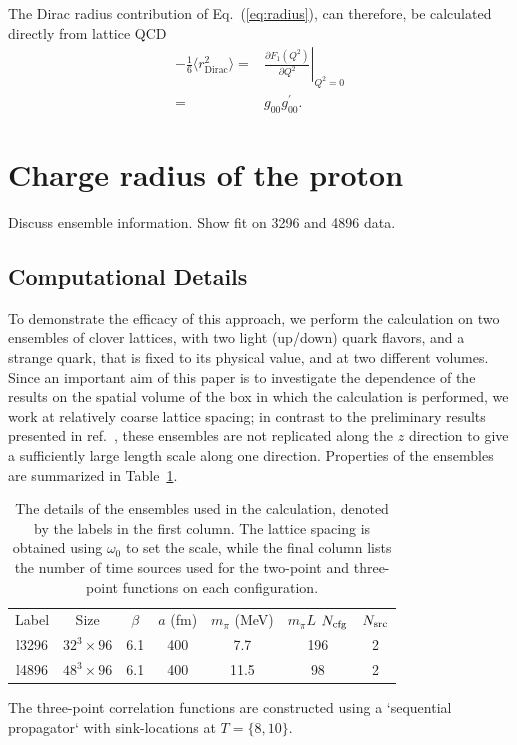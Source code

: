 \documentclass[prd,aps,twocolumn,superscriptaddress,tightenlines,nofootinbib,floatfix,preprintnumbers,10pt]{revtex4-1}
\begin{document}
The Dirac radius contribution of Eq.~(\ref{eq:radius}), can therefore, be calculated directly from lattice QCD
\begin{align}
 -\frac{1}{6}\langle r_{\mathrm{Dirac}}^2 \rangle =& \left. \frac{\partial F_1(Q^2)}{\partial
	Q^2}\right|_{Q^2=0}\nonumber \\
=&g_{00} g^\prime_{00}.
\end{align}
\section{Charge radius of the proton}\label{sec:results}
{\color{red} Discuss ensemble information. Show fit on 3296 and 4896 data.}
\subsection{Computational Details}
To demonstrate the efficacy of this approach, we perform the
calculation on two ensembles of clover lattices, with two light
(up/down) quark flavors, and a strange quark, that is fixed to its
physical value, and at two different volumes.  Since an important aim
of this paper is to investigate the dependence of the results on the
spatial volume of the box in which the calculation is performed, we
work at relatively coarse lattice spacing; in contrast to the
preliminary results presented in ref.~\cite{Bouchard:2016gmc}, these
ensembles are not replicated along the $z$ direction to give a
sufficiently large length scale along one direction.  Properties of
the ensembles are summarized in Table~\ref{tab:cfg}.
\begin{table}
  \begin{tabular}{ccccccc}
    Label & Size & $\beta$ & $a$ (fm) & $m_\pi$ (MeV) & $m_\pi L$ $N_{\rm cfg}$ & $N_{\rm src}$\\
    l3296 & $32^3 \times 96$ & 6.1 & 400 & 7.7 & 196 & 2\\
    l4896 & $48^3 \times 96$ & 6.1 & 400 & 11.5 & 98 & 2\\
  \end{tabular}
  \caption{The details of the ensembles used in the calculation, denoted by the labels in the first column.  The
    lattice spacing is obtained using $\omega_0$ to set the scale,
    while the final column lists the number of time sources used for
    the two-point and three-point functions on each
    configuration.\label{tab:cfg}}
\end{table}


The three-point correlation functions are constructed using a `sequential propagator` with sink-locations at $T=\{8,10\}$.
\end{document}
